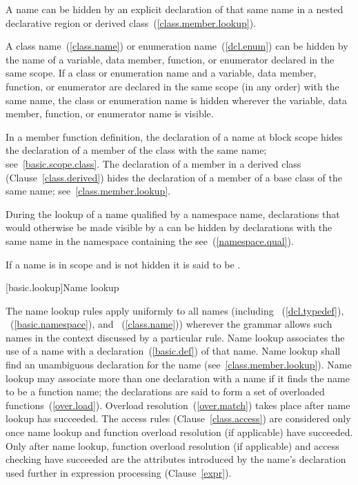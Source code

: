 \pnum
{}%
%
%
A name can be hidden by an explicit declaration of that same name in a
nested declarative region or derived class~(\ref{class.member.lookup}).

\pnum
{}%
A class name~(\ref{class.name}) or enumeration name~(\ref{dcl.enum}) can
be hidden by the name of a variable, data member, function, or enumerator declared in
the same scope. If a class or enumeration name and a variable, data member, function,
or enumerator are declared in the same scope (in any order) with the
same name, the class or enumeration name is hidden wherever the variable, data member,
function, or enumerator name is visible.

\pnum
In a member function definition, the declaration of a name
at block scope
hides
the declaration of a member of the class with the same name;
see~\ref{basic.scope.class}. The declaration of a member in a derived
class (Clause~\ref{class.derived}) hides the declaration of a member of
a base class of the same name; see~\ref{class.member.lookup}.

\pnum
During the lookup of a name qualified by a namespace name, declarations
that would otherwise be made visible by a  can
be hidden by declarations with the same name in the namespace containing
the  see~(\ref{namespace.qual}).

\pnum
{}%
If a name is in scope and is not hidden it is said to be .%

[basic.lookup]{Name lookup}%
%
%

\pnum
The name lookup rules apply uniformly to all names (including
~(\ref{dcl.typedef}),
~(\ref{basic.namespace}), and
~(\ref{class.name})) wherever the grammar allows
such names in the context discussed by a particular rule. Name lookup
associates the use of a name with a declaration~(\ref{basic.def}) of
that name. Name lookup shall find an unambiguous declaration for the
name (see~\ref{class.member.lookup}). Name lookup may associate more
than one declaration with a name if it finds the name to be a function
name; the declarations are said to form a set of overloaded
functions~(\ref{over.load}). Overload resolution~(\ref{over.match})
takes place after name lookup has succeeded. The access rules
(Clause~\ref{class.access}) are considered only once name lookup and
function overload resolution (if applicable) have succeeded. Only after
name lookup, function overload resolution (if applicable) and access
checking have succeeded are the attributes introduced by the name's
declaration used further in expression processing (Clause~\ref{expr}).


